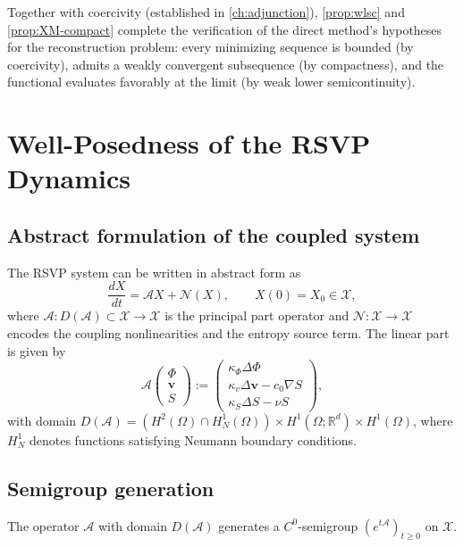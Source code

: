 \documentclass[12pt, oneside]{memoir}
\newcommand{\X}{\mathcal{X}}
\newcommand{\bv}{\mathbf{v}}
\begin{document}
Together with coercivity (established in \cref{ch:adjunction}), \cref{prop:wlsc} and
\cref{prop:XM-compact} complete the verification of the direct method's hypotheses for
the reconstruction problem: every minimizing sequence is bounded (by coercivity), admits
a weakly convergent subsequence (by compactness), and the functional evaluates favorably
at the limit (by weak lower semicontinuity).

\chapter{Well-Posedness of the RSVP Dynamics}
\label{ch:wellposed}

\section{Abstract formulation of the coupled system}

The RSVP system  can be written in abstract form as
\[
  \frac{dX}{dt} = \mathcal{A}X + \mathcal{N}(X), \qquad X(0) = X_0 \in \X,
\]
where $\mathcal{A}: D(\mathcal{A}) \subset \X \to \X$ is the principal part operator and
$\mathcal{N}: \X \to \X$ encodes the coupling nonlinearities and the entropy source term.
The linear part is given by
\[
  \mathcal{A}
  \begin{pmatrix} \Phi \\ \bv \\ S \end{pmatrix}
  :=
  \begin{pmatrix}
    \kappa_\Phi \Delta \Phi \\
    \kappa_v \Delta \bv - c_0 \nabla S \\
    \kappa_S \Delta S - \nu S
  \end{pmatrix},
\]
with domain $D(\mathcal{A}) = (H^2(\Omega) \cap H^1_N(\Omega)) \times H^1(\Omega;\mathbb{R}^d)
\times H^1(\Omega)$, where $H^1_N$ denotes functions satisfying Neumann boundary
conditions.

\section{Semigroup generation}

\begin{proposition}
\label{prop:semigroup}
The operator $\mathcal{A}$ with domain $D(\mathcal{A})$ generates a $C^0$-semigroup
$(e^{t\mathcal{A}})_{t \ge 0}$ on $\X$.
\end{proposition}
\end{document}
